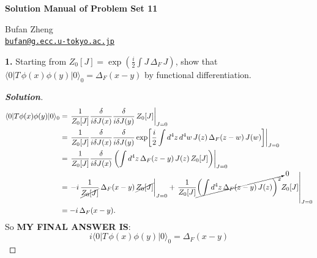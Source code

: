 \documentclass[11pt]{article}
\newenvironment{solution}[1][]{\begin{proof}[\textbf{Solution}]}{\end{proof}}
\begin{document}
\begin{center}
    {\LARGE \textbf{Solution Manual of Problem Set 11} \par}
    \vspace{1em}
    {\large Bufan Zheng\\ \href{mailto:bufan@g.ecc.u-tokyo.ac.jp}{\texttt{bufan@g.ecc.u-tokyo.ac.jp}} \par}
\end{center}

	\begin{tcolorbox}[problem]
		\textbf{1.} Starting from \(Z_0[J] = \exp\!\left(\frac{i}{2}\int J\,\Delta_F\,J\right)\), show that
		\(\langle 0|T\,\phi(x)\phi(y)|0\rangle_0=\Delta_F(x-y)\) by functional differentiation.
	\end{tcolorbox}
	\begin{solution}[11.1]
		\[
		\begin{aligned}
			\langle 0|T\phi(x)\phi(y)|0\rangle_0
			&=\left.\frac{1}{Z_0[J]}\frac{\delta}{i\delta J(x)}\frac{\delta}{i\delta J(y)}\,Z_0[J]\right|_{J=0} \\
			&=\left.\frac{1}{Z_0[J]}\frac{\delta}{i\delta J(x)}\frac{\delta}{i\delta J(y)}
			\exp\!\left[\frac{i}{2}\int d^4z\,d^4w\,J(z)\,\Delta_F(z-w)\,J(w)\right]\right|_{J=0} \\
			&=\left.\frac{1}{Z_0[J]}\frac{\delta}{i\delta J(x)}
			\left(\int d^4z\,\Delta_F(z-y)\,J(z)\,Z_0[J]\right)\right|_{J=0} \\
			&=\left.-i\,\frac{1}{\cancel{Z_0[J]}}\,\Delta_F(x-y)\,\cancel{Z_0[J]}\right|_{J=0}
			+\left.\frac{1}{Z_0[J]}
			\cancelto{0}{\left(\int d^4z\,\Delta_F(z-y)\,J(z)\right)^{2}} Z_0[J]\right|_{J=0} \\
			&=-i\,\Delta_F(x-y).
		\end{aligned}
		\]
		So \textbf{MY FINAL ANSWER IS}:
		\[
		\boxed{
		i\langle 0|T\,\phi(x)\phi(y)|0\rangle_0=\Delta_F(x-y)
		}
		\]
	\end{solution}
	
\end{document}
